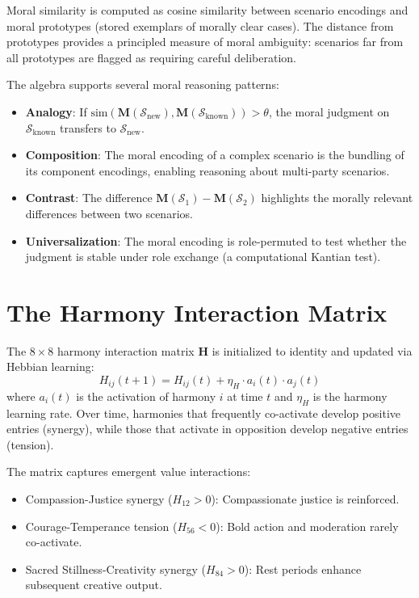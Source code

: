 \documentclass[12pt]{book}
\begin{document}
Moral similarity is computed as cosine similarity between scenario encodings and moral prototypes (stored exemplars of morally clear cases). The distance from prototypes provides a principled measure of moral ambiguity: scenarios far from all prototypes are flagged as requiring careful deliberation.

The algebra supports several moral reasoning patterns:
\begin{itemize}
  \item \textbf{Analogy}: If $\text{sim}(\mathbf{M}(\mathcal{S}_{\text{new}}), \mathbf{M}(\mathcal{S}_{\text{known}})) > \theta$, the moral judgment on $\mathcal{S}_{\text{known}}$ transfers to $\mathcal{S}_{\text{new}}$.
  \item \textbf{Composition}: The moral encoding of a complex scenario is the bundling of its component encodings, enabling reasoning about multi-party scenarios.
  \item \textbf{Contrast}: The difference $\mathbf{M}(\mathcal{S}_1) - \mathbf{M}(\mathcal{S}_2)$ highlights the morally relevant differences between two scenarios.
  \item \textbf{Universalization}: The moral encoding is role-permuted to test whether the judgment is stable under role exchange (a computational Kantian test).
\end{itemize}

\section{The Harmony Interaction Matrix}

The $8 \times 8$ harmony interaction matrix $\mathbf{H}$ is initialized to identity and updated via Hebbian learning:
\begin{equation}
H_{ij}(t+1) = H_{ij}(t) + \eta_H \cdot a_i(t) \cdot a_j(t)
\end{equation}
where $a_i(t)$ is the activation of harmony $i$ at time $t$ and $\eta_H$ is the harmony learning rate. Over time, harmonies that frequently co-activate develop positive entries (synergy), while those that activate in opposition develop negative entries (tension).

The matrix captures emergent value interactions:
\begin{itemize}
  \item Compassion-Justice synergy ($H_{12} > 0$): Compassionate justice is reinforced.
  \item Courage-Temperance tension ($H_{56} < 0$): Bold action and moderation rarely co-activate.
  \item Sacred Stillness-Creativity synergy ($H_{84} > 0$): Rest periods enhance subsequent creative output.
\end{itemize}
\end{document}
